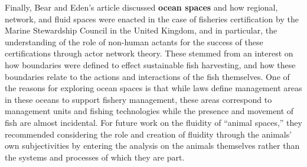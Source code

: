 \documentclass[a4paper, 10.5pt]{article} %
\begin{document}
Finally, Bear and Eden's article discussed \textbf{ocean spaces} and how regional, network, and fluid spaces were enacted in the case of fisheries certification by the Marine Stewardship Council in the United Kingdom, and in particular, the understanding of the role of non-human actants for the success of these certifications through actor network theory. These stemmed from an interest on how boundaries were defined to effect sustainable fish harvesting, and how these boundaries relate to the actions and interactions of the fish themselves. One of the reasons for exploring ocean spaces is that while laws define management areas in these oceans to support fishery management, these areas correspond to management units and fishing technologies while the presence and movement of fish are almost incidental. For future work on the fluidity of \enquote{animal spaces,} they recommended considering the role and creation of fluidity through the animals' own subjectivities by entering the analysis on the animals themselves rather than the systems and processes of which they are part.







\end{document}
